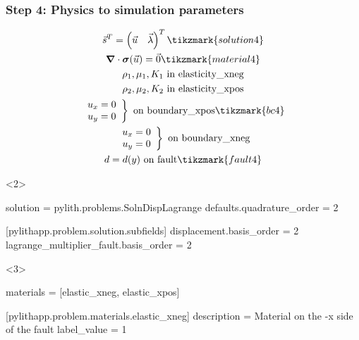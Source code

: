 \documentclass[aspectratio=169]{beamer}
\begin{document}
\begin{frame}[t,fragile]
  \frametitle{Step 4: Physics to simulation parameters}
  \summary{}

  \begin{minipage}[t]{0.35\textwidth}
    {\scriptsize
    \begin{gather*}
    \vec{s}^T = \left( \vec{u} \quad \vec{\lambda} \right)^T \tikzmark{solution4}\\
    \tensor{\nabla} \cdot \tensor{\sigma}(\vec{u}) = \vec{0} \tikzmark{material4} \\
    \rho_1, \mu_1, K_1 \text{ in elasticity\_xneg} \\ 
    \rho_2, \mu_2, K_2 \text{ in elasticity\_xpos} \\ 
    \left. \begin{array}{c} u_x = 0 \\ u_y = 0 \end{array}\right\} \text{ on boundary\_xpos} \tikzmark{bc4}\\
    \left. \begin{array}{c} u_x = 0 \\ u_y = 0 \end{array}\right\} \text{ on boundary\_xneg} \\
    d = d(y) \text{ on fault} \tikzmark{fault4}
    \end{gather*}}
  \end{minipage}
  \hfill
  \begin{minipage}[t]{0.60\textwidth}
    \begin{onlyenv}<2>
      \begin{cfgcode}
        solution = pylith.problems.SolnDispLagrange
        defaults.quadrature_order = 2

        [pylithapp.problem.solution.subfields]
        displacement.basis_order = 2
        lagrange_multiplier_fault.basis_order = 2
      \end{cfgcode}
    \end{onlyenv}
    \begin{onlyenv}<3>
      \begin{cfgcode}
        materials = [elastic_xneg, elastic_xpos]

        [pylithapp.problem.materials.elastic_xneg]
        description = Material on the -x side of the fault
        label_value = 1


\end{cfgcode}
\end{onlyenv}
\end{minipage}
\end{frame}
\end{document}
